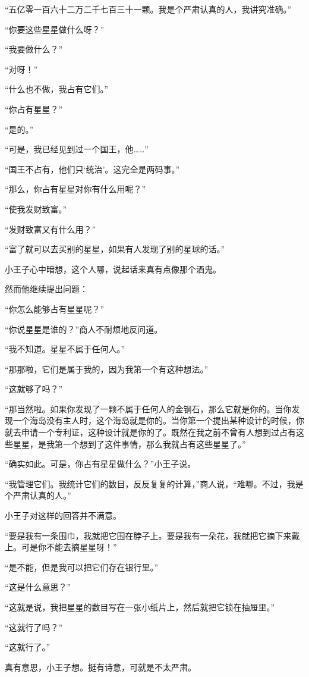 “五亿零一百六十二万二千七百三十一颗。我是个严肃认真的人，我讲究准确。”

“你要这些星星做什么呀？”

“我要做什么？”

“对呀！”

“什么也不做，我占有它们。”

“你占有星星？”

“是的。”

“可是，我已经见到过一个国王，他\ldots{}\ldots{}”

“国王不占有，他们只‘统治'。这完全是两码事。”

“那么，你占有星星对你有什么用呢？”

“使我发财致富。”

“发财致富又有什么用？”

“富了就可以去买别的星星，如果有人发现了别的星球的话。”

小王子心中暗想，这个人哪，说起话来真有点像那个酒鬼。

然而他继续提出问题：

“你怎么能够占有星星呢？”

“你说星星是谁的？”商人不耐烦地反问道。

“我不知道。星星不属于任何人。”

“那那啦，它们是属于我的，因为我第一个有这种想法。”

“这就够了吗？”

“那当然啦。如果你发现了一颗不属于任何人的金钢石，那么它就是你的。当你发现一个海岛没有主人时，这个海岛就是你的。当你第一个提出某种设计的时候，你就去申请一个专利证，这种设计就是你的了。既然在我之前不曾有人想到过占有这些星星，是我第一个想到了这件事情，那么我就占有这些星星了。”

“确实如此。可是，你占有星星做什么？”小王子说。

“我管理它们。我统计它们的数目，反反复复的计算，”商人说，“难哪。不过，我是个严肃认真的人。”

小王子对这样的回答并不满意。

“要是我有一条围巾，我就把它围在脖子上。要是我有一朵花，我就把它摘下来戴上。可是你不能去摘星星呀！”

“是不能，但是我可以把它们存在银行里。”

“这是什么意思？”

“这就是说，我把星星的数目写在一张小纸片上，然后就把它锁在抽屉里。”

“这就行了吗？”

“这就行了。”

真有意思，小王子想。挺有诗意，可就是不太严肃。

